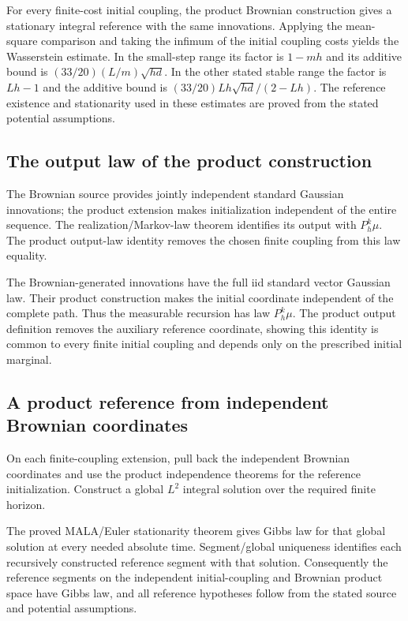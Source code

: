 \documentclass[11pt,a4paper]{article}
\begin{document}
For every finite-cost initial coupling, the product Brownian construction gives a stationary integral reference with the same innovations. Applying the mean-square comparison and taking the infimum of the initial coupling costs yields the Wasserstein estimate. In the small-step range its factor is \(1-mh\) and its additive bound is \((33/20)(L/m)\sqrt{hd}\). In the other stated stable range the factor is \(Lh-1\) and the additive bound is \((33/20)Lh\sqrt{hd}/(2-Lh)\). The reference existence and stationarity used in these estimates are proved from the stated potential assumptions.


\subsection{\texorpdfstring{The output law of the product construction}{The output law of the product construction}}


The Brownian source provides jointly independent standard Gaussian innovations; the product extension makes initialization independent of the entire sequence. The realization/\allowbreak{}Markov-law theorem identifies its output with \(P_h^k\mu\). The product output-law identity removes the chosen finite coupling from this law equality.



The Brownian-generated innovations have the full iid standard vector Gaussian law. Their product construction makes the initial coordinate independent of the complete path. Thus the measurable recursion has law \(P_h^k\mu\). The product output definition removes the auxiliary reference coordinate, showing this identity is common to every finite initial coupling and depends only on the prescribed initial marginal.


\subsection{\texorpdfstring{A product reference from independent Brownian coordinates}{A product reference from independent Brownian coordinates}}


On each finite-coupling extension, pull back the independent Brownian coordinates and use the product independence theorems for the reference initialization. Construct a global \(L^2\) integral solution over the required finite horizon.



The proved MALA/\allowbreak{}Euler stationarity theorem gives Gibbs law for that global solution at every needed absolute time. Segment/\allowbreak{}global uniqueness identifies each recursively constructed reference segment with that solution. Consequently the reference segments on the independent initial-coupling and Brownian product space have Gibbs law, and all reference hypotheses follow from the stated source and potential assumptions.
\end{document}
